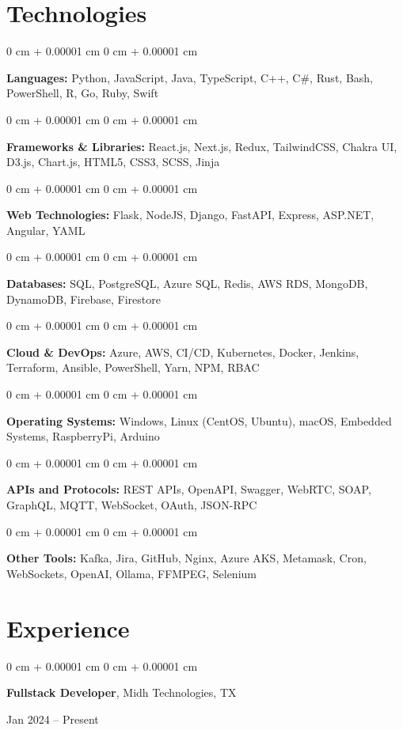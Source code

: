 \documentclass[10pt, letterpaper]{article}
\newenvironment{onecolentry}{
    \begin{adjustwidth}{
        0 cm + 0.00001 cm
    }{
        0 cm + 0.00001 cm
    }
}{
    \end{adjustwidth}
} %
\newenvironment{twocolentry}[2][]{
    \onecolentry
    \def\secondColumn{#2}
    \setcolumnwidth{\fill, 4.5 cm}
    \begin{paracol}{2}
}{
    \switchcolumn \raggedleft \secondColumn
    \end{paracol}
    \endonecolentry
} %
\begin{document}
	


\section{Technologies}
\begin{onecolentry}
	\textbf{Languages:} Python, JavaScript, Java, TypeScript, C++, C\#, Rust, Bash, PowerShell, R, Go, Ruby, Swift
\end{onecolentry}
\begin{onecolentry}
	\textbf{Frameworks \& Libraries:} React.js, Next.js, Redux, TailwindCSS, Chakra UI, D3.js, Chart.js, HTML5, CSS3, SCSS, Jinja
\end{onecolentry}
\begin{onecolentry}
	\textbf{Web Technologies:} Flask, NodeJS, Django, FastAPI, Express, ASP.NET, Angular, YAML
\end{onecolentry}
\begin{onecolentry}
	\textbf{Databases:} SQL, PostgreSQL, Azure SQL, Redis, AWS RDS, MongoDB, DynamoDB, Firebase, Firestore
\end{onecolentry}
\begin{onecolentry}
	\textbf{Cloud \& DevOps:} Azure, AWS, CI/CD, Kubernetes, Docker, Jenkins, Terraform, Ansible, PowerShell, Yarn, NPM, RBAC
\end{onecolentry}
\begin{onecolentry}
	\textbf{Operating Systems:} Windows, Linux (CentOS, Ubuntu), macOS, Embedded Systems, RaspberryPi, Arduino
\end{onecolentry}
\begin{onecolentry}
	\textbf{APIs and Protocols:} REST APIs, OpenAPI, Swagger, WebRTC, SOAP, GraphQL, MQTT, WebSocket, OAuth, JSON-RPC
\end{onecolentry}
\begin{onecolentry}
	\textbf{Other Tools:} Kafka, Jira, GitHub, Nginx, Azure AKS, Metamask, Cron, WebSockets, OpenAI, Ollama, FFMPEG, Selenium
\end{onecolentry}





\section{Experience}

\begin{twocolentry}{
	Jan 2024 – Present
}
\textbf{Fullstack Developer}, Midh Technologies, TX
\end{twocolentry}
\end{document}
